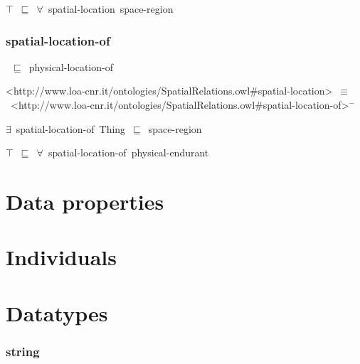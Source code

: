 \documentclass{article}
\begin{document}
\ensuremath{\top}~\ensuremath{\sqsubseteq}~\ensuremath{\forall}~spatial-location~space-region

\subsubsection*{spatial-location-of}

~\ensuremath{\sqsubseteq}~physical-location-of

<http://www.loa-cnr.it/ontologies/SpatialRelations.owl#spatial-location>~\ensuremath{\equiv}~<http://www.loa-cnr.it/ontologies/SpatialRelations.owl#spatial-location-of>\ensuremath{^-}

\ensuremath{\exists}~spatial-location-of~Thing~\ensuremath{\sqsubseteq}~space-region

\ensuremath{\top}~\ensuremath{\sqsubseteq}~\ensuremath{\forall}~spatial-location-of~physical-endurant

\section*{Data properties}\section*{Individuals}\section*{Datatypes}\subsubsection*{string}
\end{document}
